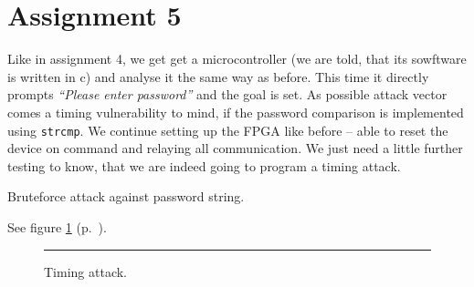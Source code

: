 \section*{Assignment 5}
%
% 

Like in assignment 4, we get get a microcontroller (we are told, that its sowftware is written in c) and analyse it the same way as before. 
This time it directly prompts \textit{``Please enter password''} and the goal is set. As possible attack vector comes a timing vulnerability to mind, if the password comparison is implemented using \texttt{strcmp}. We continue setting up the FPGA like before -- able to reset the device on command and relaying all communication. We just need a little further testing to know, that we are indeed going to program a timing attack.

Bruteforce attack against password string. 

See figure \ref{fig:as5-schematic} (p.~\pageref{fig:as5-schematic}).

\begin{figure}[tb]
    \begin{center}
        
        \caption{Timing attack.}
        \label{fig:as5-schematic}
        \vspace{1em}\hrule
    \end{center}
\end{figure}
